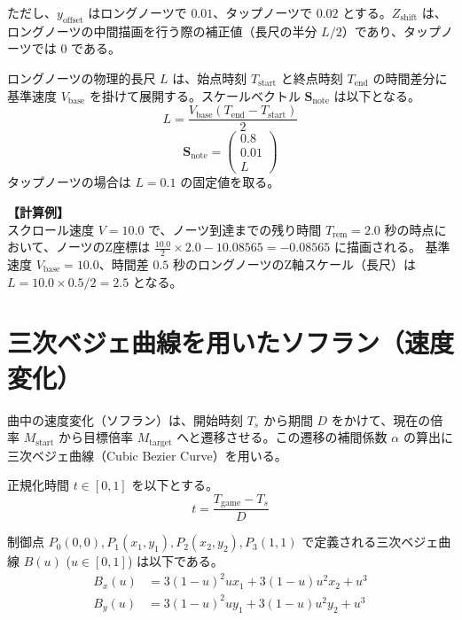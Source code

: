 \documentclass[a4paper,11pt]{ltjsarticle}
\begin{document}
ただし、$y_{\mathrm{offset}}$ はロングノーツで $0.01$、タップノーツで $0.02$ とする。$Z_{\mathrm{shift}}$ は、ロングノーツの中間描画を行う際の補正値（長尺の半分 $L/2$）であり、タップノーツでは $0$ である。

ロングノーツの物理的長尺 $L$ は、始点時刻 $T_{\mathrm{start}}$ と終点時刻 $T_{\mathrm{end}}$ の時間差分に基準速度 $V_{\mathrm{base}}$ を掛けて展開する。スケールベクトル $\bm{S}_{\mathrm{note}}$ は以下となる。
\begin{equation}
    L = \frac{V_{\mathrm{base}} (T_{\mathrm{end}} - T_{\mathrm{start}})}{2}
\end{equation}
\begin{equation}
    \bm{S}_{\mathrm{note}} = 
    \begin{pmatrix}
    0.8 \\
    0.01 \\
    L
    \end{pmatrix}
\end{equation}
タップノーツの場合は $L = 0.1$ の固定値を取る。

\textbf{【計算例】} \\
スクロール速度 $V = 10.0$ で、ノーツ到達までの残り時間 $T_{\mathrm{rem}} = 2.0$ 秒の時点において、ノーツのZ座標は $\frac{10.0}{2} \times 2.0 - 10.08565 = -0.08565$ に描画される。
基準速度 $V_{\mathrm{base}} = 10.0$、時間差 $0.5$ 秒のロングノーツのZ軸スケール（長尺）は $L = 10.0 \times 0.5 / 2 = 2.5$ となる。

\section{三次ベジェ曲線を用いたソフラン（速度変化）}

曲中の速度変化（ソフラン）は、開始時刻 $T_s$ から期間 $D$ をかけて、現在の倍率 $M_{\mathrm{start}}$ から目標倍率 $M_{\mathrm{target}}$ へと遷移させる。この遷移の補間係数 $\alpha$ の算出に三次ベジェ曲線（Cubic Bezier Curve）を用いる。

正規化時間 $t \in [0,1]$ を以下とする。
\begin{equation}
    t = \frac{T_{\mathrm{game}} - T_s}{D}
\end{equation}

制御点 $P_0(0,0), P_1(x_1, y_1), P_2(x_2, y_2), P_3(1,1)$ で定義される三次ベジェ曲線 $B(u)$ ($u \in [0, 1]$) は以下である。
\begin{align}
    B_x(u) &= 3(1-u)^2 u x_1 + 3(1-u) u^2 x_2 + u^3 \\
    B_y(u) &= 3(1-u)^2 u y_1 + 3(1-u) u^2 y_2 + u^3
\end{align}
\end{document}
